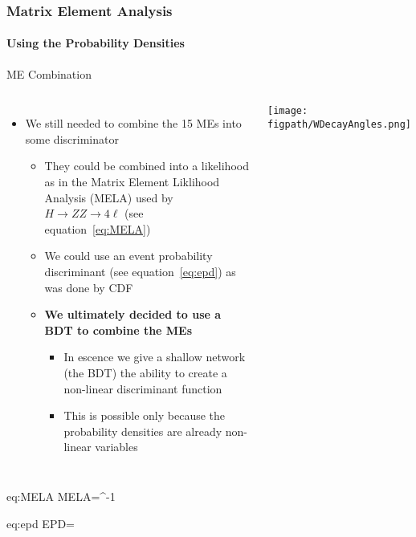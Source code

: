 \begin{frame}
	\frametitle{Matrix Element Analysis}
	\framesubtitle{Using the Probability Densities}
	\vspace*{-0.24cm}

	\begin{block}{ME Combination}
		\begin{columns}[T]
			\begin{itemize}
				\item We still needed to combine the 15 MEs into some discriminator
				\begin{itemize}
					\item They could be combined into a likelihood as in the Matrix Element Liklihood Analysis (MELA) used by $H{\rightarrow}ZZ{\rightarrow}4\ell$ (see equation~\ref{eq:MELA})
					\item We could use an event probability discriminant (see equation~\ref{eq:epd}) as was done by CDF
					\item \textbf{We ultimately decided to use a BDT to combine the MEs}
					\begin{itemize}
						\item In escence we give a shallow network (the BDT) the ability to create a non-linear discriminant function
						\item This is possible only because the probability densities are already non-linear variables
					\end{itemize}
				\end{itemize}
			\end{itemize}
			\vspace*{0.7cm}
			\texttt{[image: \\figpath/WDecayAngles.png]}%
		\end{columns}
		\begin{aeq}{eq:MELA}
MELA=^{-1}
		\end{aeq}
		\begin{aeq}{eq:epd}
EPD=
		\end{aeq}
	\end{block}
\end{frame}

